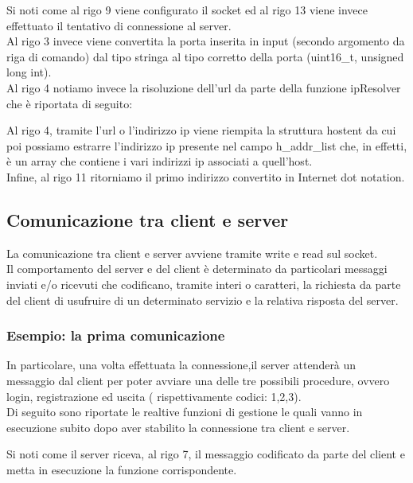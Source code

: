 \documentclass[a4paper]{article}
\begin{document}
Si noti come al rigo 9 viene configurato il socket ed al rigo 13 viene invece effettuato il tentativo di connessione al server.\\
Al rigo 3 invece viene convertita la porta inserita in input (secondo argomento da riga di comando) dal tipo stringa al tipo corretto della porta (uint16\_t, unsigned long int).\\
Al rigo 4 notiamo invece la risoluzione dell'url da parte della funzione ipResolver che è riportata di seguito:

Al rigo 4, tramite l'url o l'indirizzo ip viene riempita la struttura hostent da cui poi possiamo estrarre l'indirizzo ip presente nel campo 
h\_addr\_list  che, in effetti, è un array che contiene i vari indirizzi ip associati a quell'host.\\
Infine, al rigo 11 ritorniamo il primo indirizzo convertito in Internet dot notation.
\pagebreak
\subsection{Comunicazione tra client e server}
La comunicazione tra client e server avviene tramite write e read sul socket.\\
Il comportamento del server e del client è determinato da particolari messaggi inviati e/o ricevuti che codificano, tramite interi o caratteri, la richiesta da parte del client
 di usufruire di un determinato servizio e la relativa risposta del server.
 \subsubsection{Esempio: la prima comunicazione}
 In particolare, una volta effettuata la connessione,il server attenderà un messaggio dal client per poter avviare 
 una delle tre possibili procedure, ovvero login, registrazione ed uscita ( rispettivamente codici: 1,2,3).\\
Di seguito sono riportate le realtive funzioni di gestione le quali vanno in esecuzione subito dopo aver stabilito la connessione
tra client e server.

Si noti come il server riceva, al rigo 7, il messaggio codificato da parte del client e metta in esecuzione la funzione corrispondente.

\pagebreak
\end{document}
